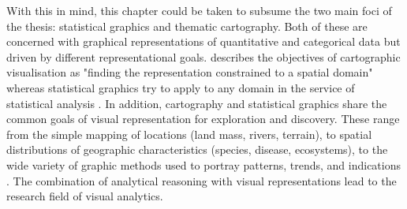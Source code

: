 With this in mind, this chapter could be taken to subsume the two main foci of the thesis: statistical graphics and thematic cartography. Both of these are concerned with graphical representations of quantitative and categorical data but driven by different representational goals. \citeauthor{Friendly.2001} describes the objectives of cartographic visualisation as "finding the representation constrained to a spatial domain" whereas statistical graphics try to apply to any domain in the service of statistical analysis . In addition, cartography and statistical graphics share the common goals of visual representation for exploration and discovery. These range from the simple mapping of locations (land mass, rivers, terrain), to spatial distributions of geographic characteristics (species, disease, ecosystems), to the wide variety of graphic methods used to portray patterns, trends, and indications . The combination of analytical reasoning with visual representations lead to the research field of visual analytics.


